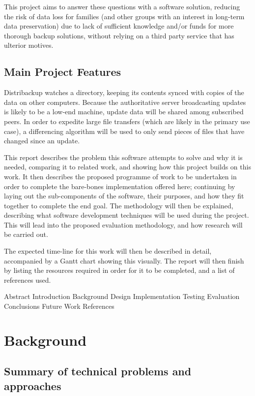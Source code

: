 \documentclass[12pt,a4paper,]{adreport}
\begin{document}
This project aims to answer these questions with a software solution,
reducing the risk of data loss for families (and other groups with an
interest in long-term data preservation) due to lack of sufficient
knowledge and/or funds for more thorough backup solutions, without
relying on a third party service that has ulterior motives.

\section{Main Project Features}\label{main-project-features}

Distribackup watches a directory, keeping its contents synced with
copies of the data on other computers. Because the authoritative server
broadcasting updates is likely to be a low-end machine, update data will
be shared among subscribed peers. In order to expedite large file
transfers (which are likely in the primary use case), a differencing
algorithm will be used to only send pieces of files that have changed
since an update.

This report describes the problem this software attempts to solve and
why it is needed, comparing it to related work, and showing how this
project builds on this work. It then describes the proposed programme of
work to be undertaken in order to complete the bare-bones implementation
offered here; continuing by laying out the sub-components of the
software, their purposes, and how they fit together to complete the end
goal. The methodology will then be explained, describing what software
development techniques will be used during the project. This will lead
into the proposed evaluation methodology, and how research will be
carried out.

The expected time-line for this work will then be described in detail,
accompanied by a Gantt chart showing this visually. The report will then
finish by listing the resources required in order for it to be
completed, and a list of references used.

Abstract Introduction Background Design Implementation Testing
Evaluation Conclusions Future Work References

\chapter{Background}\label{background}

\section{Summary of technical problems and
approaches}\label{summary-of-technical-problems-and-approaches}
\end{document}

